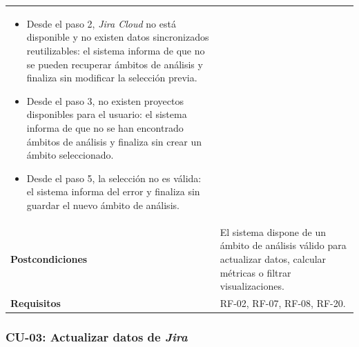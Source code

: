 {\begin{longtable}{p{3.2cm}p{10.2cm}}
\begin{minipage}[t]{10.2cm}
\begin{itemize}[noitemsep,leftmargin=*]
    \item Desde el paso 2, \textit{Jira Cloud} no está disponible y no existen datos sincronizados reutilizables: el sistema informa de que no se pueden recuperar ámbitos de análisis y finaliza sin modificar la selección previa.
    \item Desde el paso 3, no existen proyectos disponibles para el usuario: el sistema informa de que no se han encontrado ámbitos de análisis y finaliza sin crear un ámbito seleccionado.
    \item Desde el paso 5, la selección no es válida: el sistema informa del error y finaliza sin guardar el nuevo ámbito de análisis.
\end{itemize}\end{minipage} \\
\textbf{Postcondiciones} & El sistema dispone de un ámbito de análisis válido para actualizar datos, calcular métricas o filtrar visualizaciones. \\
\textbf{Requisitos} & RF-02, RF-07, RF-08, RF-20. \\
\bottomrule
\end{longtable}
\vspace{0.45em}
}

\clearpage
\subsubsection{CU-03: Actualizar datos de \textit{Jira}}

